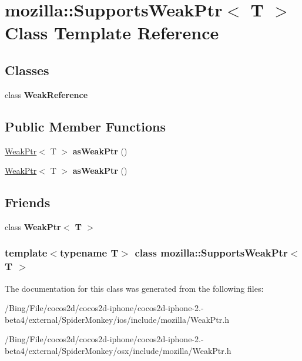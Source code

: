 \hypertarget{classmozilla_1_1_supports_weak_ptr}{\section{mozilla\-:\-:Supports\-Weak\-Ptr$<$ T $>$ Class Template Reference}
\label{classmozilla_1_1_supports_weak_ptr}
}
\subsection*{Classes}
\begin{DoxyCompactItemize}
\item 
class {\bfseries Weak\-Reference}
\end{DoxyCompactItemize}
\subsection*{Public Member Functions}
\begin{DoxyCompactItemize}
\item 
\hypertarget{classmozilla_1_1_supports_weak_ptr_a2cdf96854f4064c959d31e55c0678780}{\hyperlink{classmozilla_1_1_weak_ptr}{Weak\-Ptr}$<$ T $>$ {\bfseries as\-Weak\-Ptr} ()}\label{classmozilla_1_1_supports_weak_ptr_a2cdf96854f4064c959d31e55c0678780}

\item 
\hypertarget{classmozilla_1_1_supports_weak_ptr_a2cdf96854f4064c959d31e55c0678780}{\hyperlink{classmozilla_1_1_weak_ptr}{Weak\-Ptr}$<$ T $>$ {\bfseries as\-Weak\-Ptr} ()}\label{classmozilla_1_1_supports_weak_ptr_a2cdf96854f4064c959d31e55c0678780}

\end{DoxyCompactItemize}
\subsection*{Friends}
\begin{DoxyCompactItemize}
\item 
\hypertarget{classmozilla_1_1_supports_weak_ptr_aa41019c2e01db7e96b47e2bf8b2a9f13}{class {\bfseries Weak\-Ptr$<$ T $>$}}\label{classmozilla_1_1_supports_weak_ptr_aa41019c2e01db7e96b47e2bf8b2a9f13}

\end{DoxyCompactItemize}
\subsubsection*{template$<$typename T$>$ class mozilla\-::\-Supports\-Weak\-Ptr$<$ T $>$}



The documentation for this class was generated from the following files\-:\begin{DoxyCompactItemize}
\item 
/\-Bing/\-File/cocos2d/cocos2d-\/iphone/cocos2d-\/iphone-\/2.-\/beta4/external/\-Spider\-Monkey/ios/include/mozilla/Weak\-Ptr.\-h\item 
/\-Bing/\-File/cocos2d/cocos2d-\/iphone/cocos2d-\/iphone-\/2.-\/beta4/external/\-Spider\-Monkey/osx/include/mozilla/Weak\-Ptr.\-h\end{DoxyCompactItemize}
